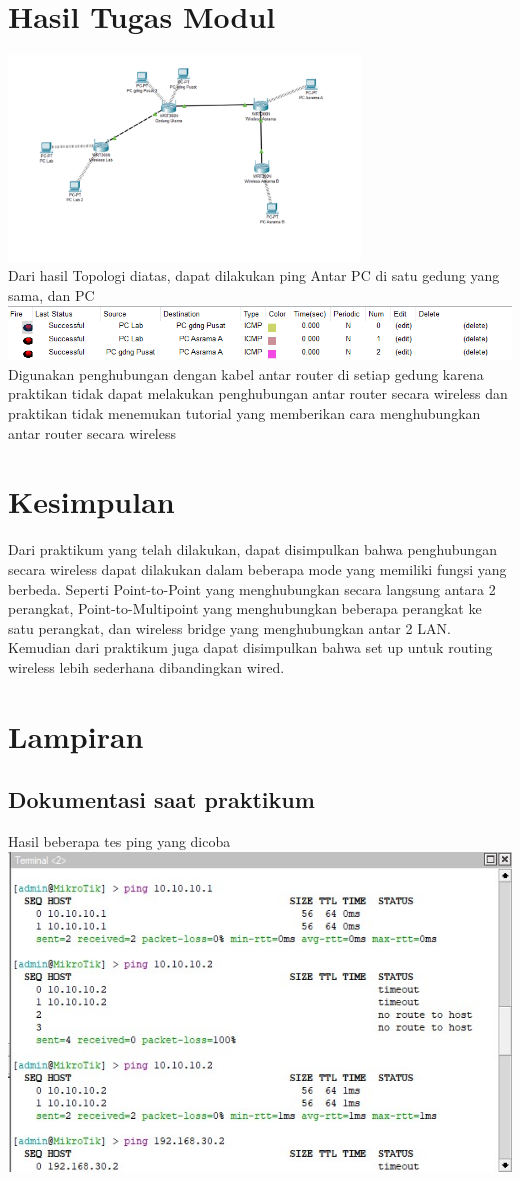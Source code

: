 \section{Hasil Tugas Modul}
\includegraphics[width=0.7\textwidth]{p4/img/tumod.png}\\
Dari hasil Topologi diatas, dapat dilakukan ping Antar PC di satu gedung yang sama, dan PC\\
\includegraphics[width=1.0\textwidth]{p4/img/tumod2.png}\\
Digunakan penghubungan dengan kabel antar router di setiap gedung karena praktikan tidak dapat melakukan penghubungan antar router secara wireless dan praktikan tidak menemukan tutorial yang memberikan cara menghubungkan antar router secara wireless

\section{Kesimpulan}
Dari praktikum yang telah dilakukan, dapat disimpulkan bahwa penghubungan secara wireless dapat dilakukan dalam beberapa mode yang memiliki fungsi yang berbeda. Seperti Point-to-Point yang menghubungkan secara langsung antara 2 perangkat, Point-to-Multipoint yang menghubungkan beberapa perangkat ke satu perangkat, dan wireless bridge yang menghubungkan antar 2 LAN. Kemudian dari praktikum juga dapat disimpulkan bahwa set up untuk routing wireless lebih sederhana dibandingkan wired.

\section{Lampiran}
\subsection{Dokumentasi saat praktikum}
Hasil beberapa tes ping yang dicoba\\
\includegraphics{p4/img/pingrslt1.jpg}

